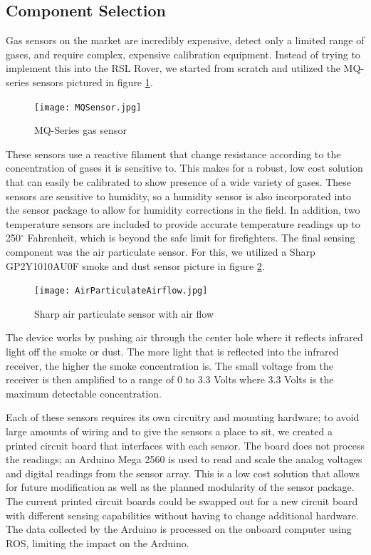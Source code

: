 \subsection{Component Selection}

Gas sensors on the market are incredibly expensive, detect only a limited range of gases, and require complex, expensive calibration equipment. Instead of trying to implement this into the RSL Rover, we started from scratch and utilized the MQ-series sensors pictured in figure \ref{fig:MQSensor}.

\begin{figure}[h!]
	\centering
	\texttt{[image: MQSensor.jpg]}
	\caption{MQ-Series gas sensor}
	\label{fig:MQSensor}
\end{figure}

These sensors use a reactive filament that change resistance according to the concentration of gases it is sensitive to. This makes for a robust, low cost solution that can easily be calibrated to show presence of a wide variety of gases. These sensors are sensitive to humidity, so a humidity sensor is also incorporated into the sensor package to allow for humidity corrections in the field. In addition, two temperature sensors are included to provide accurate temperature readings up to 250$^{\circ}$ Fahrenheit, which is beyond the safe limit for firefighters. The final sensing component was the air particulate sensor. For this, we utilized a Sharp GP2Y1010AU0F smoke and dust sensor picture in figure \ref{fig:SmokeDetector}. 

\begin{figure}[h!]
	\centering
	\texttt{[image: AirParticulateAirflow.jpg]}
	\caption{Sharp air particulate sensor with air flow}
	\label{fig:SmokeDetector}
\end{figure}

The device works by pushing air through the center hole where it reflects infrared light off the smoke or dust. The more light that is reflected into the infrared receiver, the higher the smoke concentration is. The small voltage from the receiver is then amplified to a range of 0 to 3.3 Volts where 3.3 Volts is the maximum detectable concentration.

Each of these sensors requires its own circuitry and mounting hardware; to avoid large amounts of wiring and to give the sensors a place to sit, we created a printed circuit board that interfaces with each sensor. The board does not process the readings; an Arduino Mega 2560 is used to read and scale the analog voltages and digital readings from the sensor array. This is a low cost solution that allows for future modification as well as the planned modularity of the sensor package. The current printed circuit boards could be swapped out for a new circuit board with different sensing capabilities without having to change additional hardware. The data collected by the Arduino is processed on the onboard computer using ROS, limiting the impact on the Arduino.

